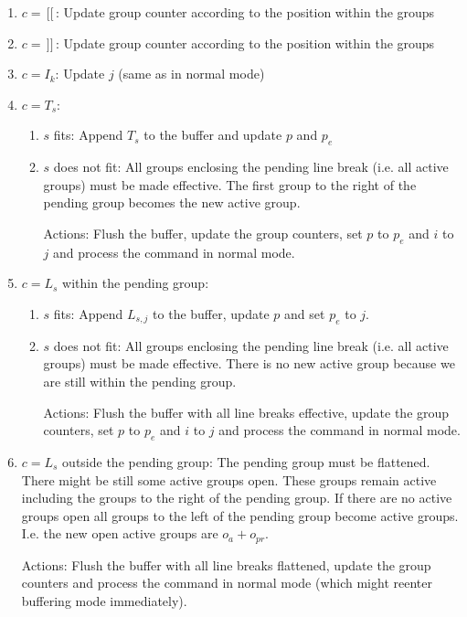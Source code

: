 \documentclass[12pt]{article}
\def\GS{\,[\![\,}
\def\GE{\,]\!]\,}
\begin{document}
\begin{enumerate}
\item $c = \GS$: Update group counter according to the position within the
  groups

\item $c = \GE$: Update group counter according to the position within the
  groups

\item $c = I_k$: Update $j$ (same as in normal mode)

\item $c = T_s$:
  \begin{enumerate}
  \item $s$ fits: Append $T_s$ to the buffer and update $p$ and $p_e$

  \item $s$ does not fit: All groups enclosing the pending line break
    (i.e. all active groups) must be made effective. The first group to the
    right of the pending group becomes the new active group.

    Actions: Flush the buffer, update the group counters, set $p$ to $p_e$ and
    $i$ to $j$ and process the command in normal mode.
  \end{enumerate}

\item $c = L_s$ within the pending group:
  \begin{enumerate}
  \item $s$ fits: Append $L_{s,j}$ to the buffer, update $p$ and set $p_e$ to
    $j$.

  \item $s$ does not fit: All groups enclosing the pending line break
    (i.e. all active groups) must be made effective. There is no new active
    group because we are still within the pending group.

    Actions: Flush the buffer with all line breaks effective, update the group
    counters, set $p$ to $p_e$ and $i$ to $j$ and process the command in
    normal mode.
  \end{enumerate}

\item $c = L_s$ outside the pending group: The pending group must be
  flattened. There might be still some active groups open. These groups remain
  active including the groups to the right of the pending group. If there are
  no active groups open all groups to the left of the pending group become
  active groups. I.e. the new open active groups are $o_a + o_{pr}$.

  Actions: Flush the buffer with all line breaks flattened, update the group
  counters and process the command in normal mode (which might reenter
  buffering mode immediately).
\end{enumerate}
\end{document}
